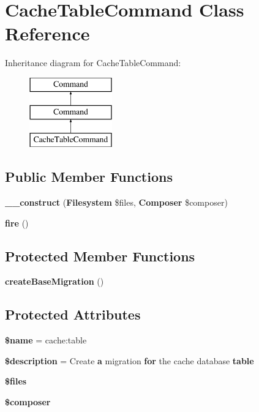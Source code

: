 \section{Cache\+Table\+Command Class Reference}
\label{class_illuminate_1_1_cache_1_1_console_1_1_cache_table_command}
Inheritance diagram for Cache\+Table\+Command\+:\begin{figure}[H]
\begin{center}
\leavevmode
\includegraphics[height=3.000000cm]{class_illuminate_1_1_cache_1_1_console_1_1_cache_table_command}
\end{center}
\end{figure}
\subsection*{Public Member Functions}
\begin{DoxyCompactItemize}
\item 
{\bf \+\_\+\+\_\+construct} ({\bf Filesystem} \$files, {\bf Composer} \$composer)
\item 
{\bf fire} ()
\end{DoxyCompactItemize}
\subsection*{Protected Member Functions}
\begin{DoxyCompactItemize}
\item 
{\bf create\+Base\+Migration} ()
\end{DoxyCompactItemize}
\subsection*{Protected Attributes}
\begin{DoxyCompactItemize}
\item 
{\bf \$name} = \textquotesingle{}cache\+:table\textquotesingle{}
\item 
{\bf \$description} = \textquotesingle{}Create {\bf a} migration {\bf for} the cache database {\bf table}\textquotesingle{}
\item 
{\bf \$files}
\item 
{\bf \$composer}
\end{DoxyCompactItemize}


